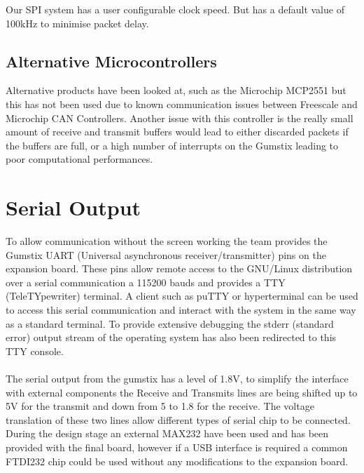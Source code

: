 \documentclass[11pt]{report} %
\begin{document}
		Our SPI system has a user configurable clock speed. But has a default
		value of 100kHz to minimise packet delay.
	
		\subsection{Alternative Microcontrollers}
		Alternative products have been looked at, such as the Microchip MCP2551 but 
		this has
		not been used due to known communication issues between Freescale and 
		Microchip
		CAN Controllers. Another issue with this controller is the really small 
		amount
		of receive and transmit buffers would lead to either discarded packets if the
		buffers are full, or a high number of interrupts on the Gumstix leading to 
		poor
		computational performances.

	\section{Serial Output}
	\label{sec:serial_output}
	To allow communication without the screen working the team provides the Gumstix
	UART (Universal asynchronous receiver/transmitter) pins on the expansion board.
	These pins allow remote access to the GNU/Linux distribution over a serial 
	communication a 115200 bauds and provides a TTY (TeleTYpewriter) terminal.
	A client such as puTTY or hyperterminal can be used to access this serial 
	communication and interact with the system in the same way as a standard 
	terminal. To provide extensive debugging the stderr (standard error) output
	stream of the operating system has also been redirected to this TTY console.\\
	\\
	The serial output from the gumstix has a level of 1.8V, to simplify the
	interface with external components the Receive and Transmits lines are being
	shifted up to 5V for the transmit and down from 5 to 1.8 for the receive. The
	voltage translation of these two lines allow different types of serial chip to 
	be connected. During the design stage an external MAX232 have been used and
	has been provided with the final board, however if a USB interface is required
	a common FTDI232 chip could be used without any modifications to the expansion
	board.
\end{document}
